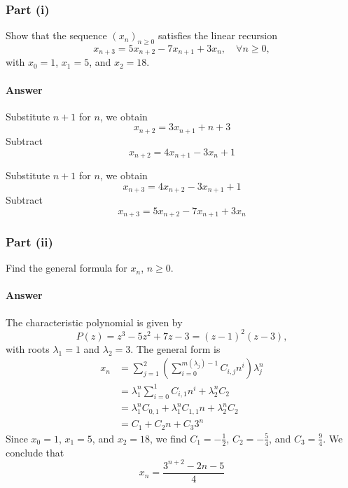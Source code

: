 \subsubsection{Part (i)}
Show that the sequence $ (x_n)_{n \geq 0} $ satisfies the linear recursion
\begin{equation*}
    x_{n + 3} = 5 x_{n + 2} - 7 x_{n + 1} + 3 x_n, \quad \forall n \geq 0,
\end{equation*}
with $ x_0 = 1 $, $ x_1 = 5 $, and $ x_2 = 18 $.

\paragraph{Answer}
Substitute $ n + 1 $ for $ n $, we obtain
\begin{equation*}
    x_{n + 2} = 3 x_{n + 1} + n + 3
\end{equation*}
Subtract
\begin{equation*}
    x_{n + 2} = 4 x_{n + 1} - 3 x_n + 1
\end{equation*}

Substitute $ n + 1 $ for $ n $, we obtain
\begin{equation*}
    x_{n + 3} = 4 x_{n + 2} - 3 x_{n + 1} + 1
\end{equation*}
Subtract
\begin{equation*}
    x_{n + 3} = 5 x_{n + 2} - 7 x_{n + 1} + 3 x_n
\end{equation*}

\subsubsection{Part (ii)}
Find the general formula for $ x_n $, $ n \geq 0 $.

\paragraph{Answer}
The characteristic polynomial is given by
\begin{equation*}
    P(z) = z^3 - 5 z^2 + 7 z - 3 = (z - 1)^2(z - 3),
\end{equation*}
with roots $ \lambda_1 = 1 $ and $ \lambda_2 = 3$.
The general form is
\begin{align*}
    x_n
        &= \sum_{j=1}^{2} \left( \sum_{i=0}^{m(\lambda_j)-1} C_{i,j} n^i
            \right) \lambda_j^n \\
        &= \lambda_1^n \sum_{i=0}^{1} C_{i,1} n^i + \lambda_2^n C_2 \\
        &= \lambda_1^n C_{0, 1} + \lambda_1^n C_{1, 1} n + \lambda_2^n C_2 \\
        &= C_1 + C_2 n + C_3 3^n
\end{align*}
Since $ x_0 = 1 $, $ x_1 = 5 $, and $ x_2 = 18 $, we find
    $ C_1 = -\frac{1}{2} $, $ C_2 = -\frac{5}{4} $, and $ C_3 = \frac{9}{4} $.
We conclude that
\begin{equation*}
    x_n = \frac{3^{n + 2} - 2n - 5}{4}
\end{equation*}

